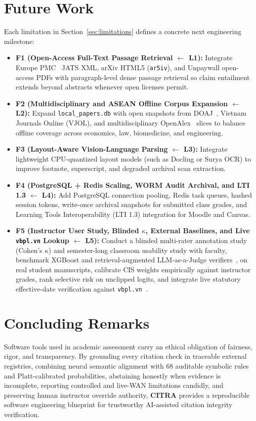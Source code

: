\section{Future Work}
\label{sec:future-work}

Each limitation in Section~\ref{sec:limitations} defines a concrete next engineering milestone:
{\setlength{\itemsep}{1pt}
\begin{itemize}
    \item \textbf{F1 (Open-Access Full-Text Passage Retrieval $\leftarrow$ L1):} Integrate Europe PMC~\cite{europepmc} JATS XML, arXiv HTML5 (\texttt{ar5iv}), and Unpaywall open-access PDFs with paragraph-level dense passage retrieval so claim entailment extends beyond abstracts whenever open licenses permit.
    \item \textbf{F2 (Multidisciplinary and ASEAN Offline Corpus Expansion $\leftarrow$ L2):} Expand \texttt{local\_papers.db} with open snapshots from DOAJ~\cite{doaj}, Vietnam Journals Online (VJOL), and multidisciplinary OpenAlex~\cite{openalex} slices to balance offline coverage across economics, law, biomedicine, and engineering.
    \item \textbf{F3 (Layout-Aware Vision-Language Parsing $\leftarrow$ L3):} Integrate lightweight CPU-quantized layout models (such as Docling or Surya OCR) to improve footnote, superscript, and degraded archival scan extraction.
    \item \textbf{F4 (PostgreSQL + Redis Scaling, WORM Audit Archival, and LTI 1.3 $\leftarrow$ L4):} Add PostgreSQL connection pooling, Redis task queues, hashed session tokens, write-once archival snapshots for submitted class grades, and Learning Tools Interoperability (LTI 1.3) integration for Moodle and Canvas.
    \item \textbf{F5 (Instructor User Study, Blinded $\kappa$, External Baselines, and Live \texttt{vbpl.vn} Lookup $\leftarrow$ L5):} Conduct a blinded multi-rater annotation study (Cohen's $\kappa$) and semester-long classroom usability study with faculty, benchmark XGBoost and retrieval-augmented LLM-as-a-Judge verifiers~\cite{hu2024refchecker}, \cite{press2024citeme} on real student manuscripts, calibrate CIS weights empirically against instructor grades, rank selective risk on unclipped logits, and integrate live statutory effective-date verification against \texttt{vbpl.vn}~\cite{vbpl-vn}.
\end{itemize}}

\section{Concluding Remarks}

Software tools used in academic assessment carry an ethical obligation of fairness, rigor, and transparency. By grounding every citation check in traceable external registries, combining neural semantic alignment with 68 auditable symbolic rules and Platt-calibrated probabilities, abstaining honestly when evidence is incomplete, reporting controlled and live-WAN limitations candidly, and preserving human instructor override authority, \textbf{CITRA} provides a reproducible software engineering blueprint for trustworthy AI-assisted citation integrity verification.
